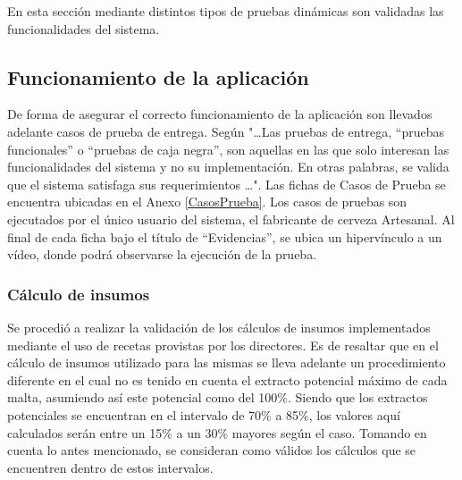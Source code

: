 \par En esta sección mediante distintos tipos de pruebas dinámicas son validadas las funcionalidades del sistema.

\subsection{Funcionamiento de la aplicación}
De forma de asegurar el correcto funcionamiento de la aplicación son llevados adelante casos de prueba de entrega. Según \cite{Som05} "\ldots Las pruebas de entrega, “pruebas funcionales” o “pruebas de caja negra”, son aquellas en las que solo interesan las funcionalidades del sistema y no su implementación. En otras palabras, se valida que el sistema satisfaga sus requerimientos \ldots".
Las fichas de Casos de Prueba se encuentra ubicadas en el Anexo \ref{CasosPrueba}. Los casos de pruebas son ejecutados por el único usuario del sistema, el fabricante de cerveza Artesanal. Al final de cada ficha bajo el título de ``Evidencias'', se ubica un hipervínculo a un vídeo, donde podrá observarse la ejecución de la prueba.

\subsubsection{Cálculo de insumos}
\par Se procedió a realizar la validación de los cálculos de insumos implementados mediante el uso de recetas provistas por los directores. Es de resaltar que en el cálculo de insumos utilizado para las mismas se lleva adelante un procedimiento diferente en el cual no es tenido en cuenta el extracto potencial máximo de cada malta, asumiendo así este potencial como del 100\%. Siendo que los extractos potenciales se encuentran en el intervalo de 70\% a 85\%, los valores aquí calculados serán entre un 15\% a un 30\% mayores según el caso. Tomando en cuenta lo antes mencionado, se consideran como válidos los cálculos que se encuentren dentro de estos intervalos.


